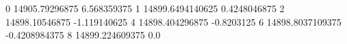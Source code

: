 0 14905.79296875 6.568359375
1 14899.6494140625 0.4248046875
2 14898.10546875 -1.119140625
4 14898.404296875 -0.8203125
6 14898.8037109375 -0.4208984375
8 14899.224609375 0.0
